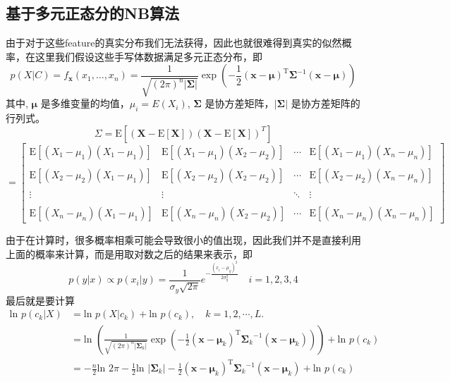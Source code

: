 \documentclass[a4paper, 1pt]{article}
\begin{document}
\begin{spacing}{1.2}
\subsection{基于多元正态分的NB算法}
由于对于这些feature的真实分布我们无法获得，因此也就很难得到真实的似然概率，在这里我们假设这些手写体数据满足多元正态分布，即
$$p(X|C)=f_{\mathbf x}(x_1,\ldots,x_n) =
\frac{1}{\sqrt{(2\pi)^n|\boldsymbol\Sigma|}}
\exp\left(-\frac{1}{2}({\mathbf x}-{\boldsymbol\mu})^\mathrm{T}{\boldsymbol\Sigma}^{-1}({\mathbf x}-{\boldsymbol\mu})\right)$$%
其中, $\boldsymbol\mu$ 是多维变量的均值，$\mu_i=E(X_i)$, $\boldsymbol\Sigma$ 是协方差矩阵，$|\boldsymbol\Sigma|$ 是协方差矩阵的行列式。
$$\Sigma=\mathrm{E}\left[\left(\textbf{X} - \mathrm{E}[\textbf{X}]\right)\left(\textbf{X} - \mathrm{E}[\textbf{X}]\right)^T\right] $$
$$=
\begin{bmatrix}
 \mathrm{E}[(X_1 - \mu_1)(X_1 - \mu_1)] & \mathrm{E}[(X_1 - \mu_1)(X_2 - \mu_2)] & \cdots & \mathrm{E}[(X_1 - \mu_1)(X_n - \mu_n)] \\ \\
 \mathrm{E}[(X_2 - \mu_2)(X_1 - \mu_1)] & \mathrm{E}[(X_2 - \mu_2)(X_2 - \mu_2)] & \cdots & \mathrm{E}[(X_2 - \mu_2)(X_n - \mu_n)] \\ \\
 \vdots & \vdots & \ddots & \vdots \\ \\
 \mathrm{E}[(X_n - \mu_n)(X_1 - \mu_1)] & \mathrm{E}[(X_n - \mu_n)(X_2 - \mu_2)] & \cdots & \mathrm{E}[(X_n - \mu_n)(X_n - \mu_n)]
\end{bmatrix}$$

由于在计算时，很多概率相乘可能会导致很小的值出现，因此我们并不是直接利用上面的概率来计算，而是用取对数之后的结果来表示，即
$$p(y|x) \propto p(x_i|y) = \frac{1}{\sigma_y\sqrt{2\pi}}e^{-\frac{(x_i-\mu_y)^2}{2\sigma_y^2}}\quad i=1,2,3,4$$
最后就是要计算
$$\begin{aligned}
\text{ln }p(c_k|X)&=\text{ln }p(X|c_k)+ \text{ln }p(c_k),\quad  k=1, 2, \cdots, L.\\
&=\text{ln }\left( \frac{1}{\sqrt{(2\pi)^n|\boldsymbol\Sigma_k|}}
\exp\left(-\frac{1}{2}({\mathbf x}-{\boldsymbol\mu_k})^\mathrm{T}{\boldsymbol\Sigma_k}^{-1}({\mathbf x}-{\boldsymbol\mu_k})\right)\right) + \text{ln }p(c_k) \\
&=-\frac{n}{2}\text{ln }2\pi -\frac{1}{2} \text{ln }|\boldsymbol\Sigma_k| -\frac{1}{2}({\mathbf x}-{\boldsymbol\mu_k})^\mathrm{T}{\boldsymbol\Sigma_k}^{-1}({\mathbf x}-{\boldsymbol\mu_k}) + \text{ln }p(c_k)
\end{aligned}$$


\end{spacing}
\end{document}
